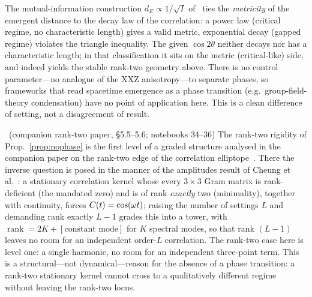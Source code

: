 \documentclass[11pt]{article}
\begin{document}
\begin{remark}\label{rem:nophase}
The mutual-information construction $d_E\propto1/\sqrt I$
of~\cite{emergentdist2025,persistenthom} ties the \emph{metricity} of the emergent distance
to the decay law of the correlation: a power law (critical regime, no characteristic
length) gives a valid metric, exponential decay (gapped regime) violates the triangle
inequality. The given $\cos2\theta$ neither decays nor has a characteristic length; in that
classification it sits on the metric (critical-like) side, and indeed yields the stable
rank-two geometry above. There is no control parameter---no analogue of the XXZ
anisotropy---to separate phases, so frameworks that read spacetime emergence as a phase
transition (e.g.\ group-field-theory condensation) have no point of application here. This
is a clean difference of setting, not a disagreement of result.
\end{remark}

\begin{remark}\label{rem:tower}
\conditional\ (companion rank-two paper, \S5.5--5.6; notebooks 34--36)
The rank-two rigidity of Prop.~\ref{prop:nophase} is the first level of a
graded structure analysed in the companion paper on the rank-two edge of
the correlation elliptope~\cite{rank2paper}. There the inverse question is
posed in the manner of the amplitudes result of Cheung et
al.~\cite{cheung2025}: a stationary correlation kernel whose every
$3\times3$ Gram matrix is rank-deficient (the mandated zero) and is of rank
\emph{exactly} two (minimality), together with continuity, forces
$C(t)=\cos(\omega t)$; raising the number of settings $L$ and demanding
rank exactly $L-1$ grades this into a tower, with
$\operatorname{rank}=2K+[\text{constant mode}]$ for $K$ spectral modes, so
that rank $(L-1)$ leaves no room for an independent order-$L$ correlation.
The rank-two case here is level one: a single harmonic, no room for an
independent three-point term. This is a structural---not dynamical---reason
for the absence of a phase transition: a rank-two stationary kernel cannot
cross to a qualitatively different regime without leaving the rank-two
locus.
\end{remark}
\end{document}
